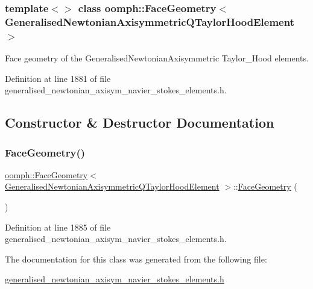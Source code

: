\subsubsection*{template$<$$>$\newline
class oomph\+::\+Face\+Geometry$<$ Generalised\+Newtonian\+Axisymmetric\+Q\+Taylor\+Hood\+Element $>$}

Face geometry of the Generalised\+Newtonian\+Axisymmetric Taylor\+\_\+\+Hood elements. 

Definition at line 1881 of file generalised\+\_\+newtonian\+\_\+axisym\+\_\+navier\+\_\+stokes\+\_\+elements.\+h.



\subsection{Constructor \& Destructor Documentation}
\mbox{\label{classoomph_1_1FaceGeometry_3_01GeneralisedNewtonianAxisymmetricQTaylorHoodElement_01_4_ab64448430b6a7a0d22c62287c6e6fe28}} 
\subsubsection{\texorpdfstring{Face\+Geometry()}{FaceGeometry()}}
{\footnotesize\ttfamily \hyperlink{classoomph_1_1FaceGeometry}{oomph\+::\+Face\+Geometry}$<$ \hyperlink{classoomph_1_1GeneralisedNewtonianAxisymmetricQTaylorHoodElement}{Generalised\+Newtonian\+Axisymmetric\+Q\+Taylor\+Hood\+Element} $>$\+::\hyperlink{classoomph_1_1FaceGeometry}{Face\+Geometry} (\begin{DoxyParamCaption}{ }\end{DoxyParamCaption})\hspace{0.3cm}{\ttfamily [inline]}}



Definition at line 1885 of file generalised\+\_\+newtonian\+\_\+axisym\+\_\+navier\+\_\+stokes\+\_\+elements.\+h.



The documentation for this class was generated from the following file\+:\begin{DoxyCompactItemize}
\item 
\hyperlink{generalised__newtonian__axisym__navier__stokes__elements_8h}{generalised\+\_\+newtonian\+\_\+axisym\+\_\+navier\+\_\+stokes\+\_\+elements.\+h}\end{DoxyCompactItemize}
